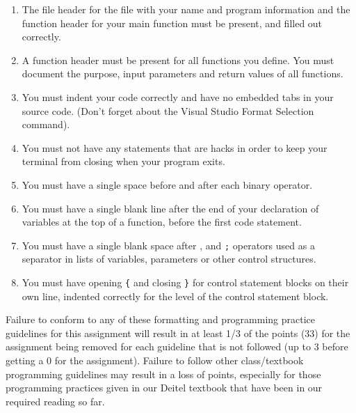 \documentclass[11pt]{article}
\begin{document}
\begin{enumerate}
\item The file header for the file with your name and program information
and the function header for your main function must be present, and
filled out correctly.
\item A function header must be present for all functions you define.
You must document the purpose, input parameters and return values
of all functions.
\item You must indent your code correctly and have no embedded tabs in
your source code. (Don't forget about the Visual Studio Format
Selection command).
\item You must not have any statements that are hacks in order to keep
your terminal from closing when your program exits.
\item You must have a single space before and after each binary operator.
\item You must have a single blank line after the end of your declaration
of variables at the top of a function, before the first code
statement.
\item You must have a single blank space after , and \verb~;~ operators used as a
separator in lists of variables, parameters or other control
structures.
\item You must have opening \verb~{~ and closing \verb~}~ for control statement blocks
on their own line, indented correctly for the level of the control
statement block.
\end{enumerate}

Failure to conform to any of these formatting and programming practice
guidelines for this assignment will result in at least 1/3 of the
points (33) for the assignment being removed for each guideline that
is not followed (up to 3 before getting a 0 for the
assignment). Failure to follow other class/textbook programming
guidelines may result in a loss of points, especially for those
programming practices given in our Deitel textbook that have been in
our required reading so far.
\end{document}
